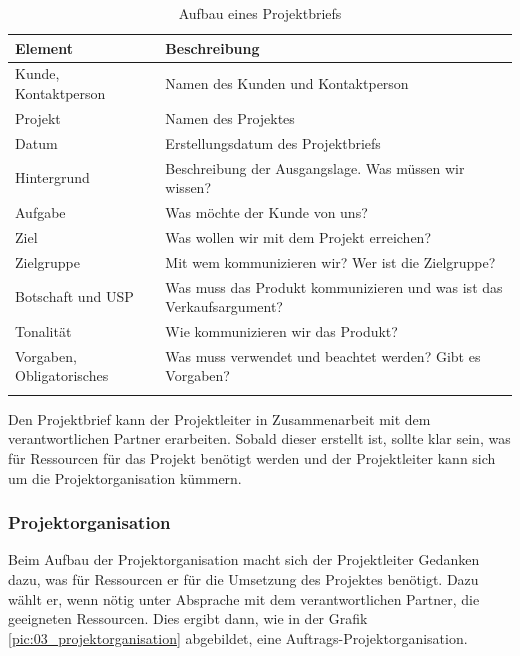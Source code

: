 \begin{longtable}{lp{10cm}}
    \toprule \textbf{Element} & \textbf{Beschreibung} \\
    \midrule Kunde, Kontaktperson &
        Namen des Kunden und Kontaktperson \\
    \midrule Projekt &
        Namen des Projektes \\
    \midrule Datum &
        Erstellungsdatum des Projektbriefs \\
    \midrule Hintergrund &
        Beschreibung der Ausgangslage. Was müssen wir wissen? \\
    \midrule Aufgabe &
        Was möchte der Kunde von uns? \\
    \midrule Ziel &
        Was wollen wir mit dem Projekt erreichen? \\
    \midrule Zielgruppe &
        Mit wem kommunizieren wir? Wer ist die Zielgruppe? \\
    \midrule Botschaft und USP &
        Was muss das Produkt kommunizieren und was ist das Verkaufsargument? \\
    \midrule Tonalität &
        Wie kommunizieren wir das Produkt? \\
    \midrule Vorgaben, Obligatorisches &
        Was muss verwendet und beachtet werden? Gibt es Vorgaben? \\
    \bottomrule
    \caption[Aufbau eines Projektbriefs]{Aufbau eines Projektbriefs\footnotemark}
    \label{tab:projektbrief}
\end{longtable}

Den Projektbrief kann der Projektleiter in Zusammenarbeit mit dem verantwortlichen 
Partner erarbeiten. Sobald dieser erstellt ist, sollte klar sein, was für 
Ressourcen für das Projekt benötigt werden und der Projektleiter kann sich um 
die Projektorganisation kümmern.

\subsubsection{Projektorganisation}
Beim Aufbau der Projektorganisation macht sich der Projektleiter Gedanken dazu,
was für Ressourcen er für die Umsetzung des Projektes benötigt. Dazu wählt er,
wenn nötig unter Absprache mit dem verantwortlichen Partner, die geeigneten 
Ressourcen. Dies ergibt dann, wie in der Grafik \ref{pic:03_projektorganisation} 
abgebildet, eine Auftrags-Projektorganisation.

\clearpage

